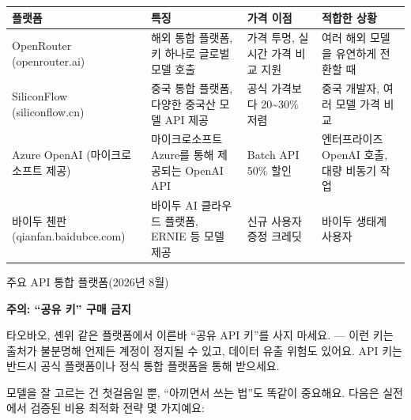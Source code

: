 \begin{center}
\begin{tabularx}{\linewidth}{|X|X|X|X|}
\hline
\textbf{플랫폼} & \textbf{특징} & \textbf{가격 이점} & \textbf{적합한 상황} \tabularnewline
\hline
OpenRouter (openrouter.ai) & 해외 통합 플랫폼, 키 하나로 글로벌 모델 호출 & 가격 투명, 실시간 가격 비교 지원 & 여러 해외 모델을 유연하게 전환할 때 \tabularnewline
SiliconFlow (siliconflow.cn) & 중국 통합 플랫폼, 다양한 중국산 모델 API 제공 & 공식 가격보다 20\textasciitilde{}30\% 저렴 & 중국 개발자, 여러 모델 가격 비교 \tabularnewline
Azure OpenAI (마이크로소프트 제공) & 마이크로소프트 Azure를 통해 제공되는 OpenAI API & Batch API 50\% 할인 & 엔터프라이즈 OpenAI 호출, 대량 비동기 작업 \tabularnewline
바이두 첸판(qianfan.baidubce.com) & 바이두 AI 클라우드 플랫폼, ERNIE 등 모델 제공 & 신규 사용자 증정 크레딧 & 바이두 생태계 사용자 \tabularnewline
\hline
\end{tabularx}
\end{center}

\begin{center}\small\color{gray}주요 API 통합 플랫폼(2026년 8월)\end{center}

\textbf{주의: “공유 키” 구매 금지}\par

타오바오, 셴위 같은 플랫폼에서 이른바 “공유 API 키”를 사지 마세요. — 이런 키는 출처가 불분명해 언제든 계정이 정지될 수 있고, 데이터 유출 위험도 있어요. API 키는 반드시 공식 플랫폼이나 정식 통합 플랫폼을 통해 받으세요.


모델을 잘 고르는 건 첫걸음일 뿐, “아끼면서 쓰는 법”도 똑같이 중요해요. 다음은 실전에서 검증된 비용 최적화 전략 몇 가지예요:


